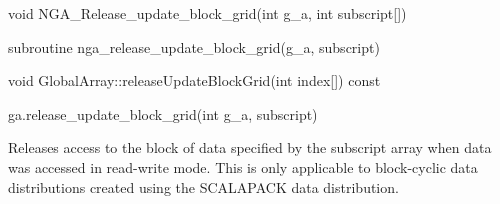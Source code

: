 \documentclass[12pt]{article}
\begin{document}


\begin{capi}
\begin{ccode}
void NGA_Release_update_block_grid(int g_a, int subscript[])
\end{ccode}
\begin{funcargs}
\end{funcargs}
\end{capi}

\begin{fapi}
\begin{fcode}
subroutine nga_release_update_block_grid(g_a, subscript)
\end{fcode}
\begin{funcargs}
\end{funcargs}
\end{fapi}

\begin{cxxapi}
\begin{cxxcode}
void GlobalArray::releaseUpdateBlockGrid(int index[]) const
\end{cxxcode}
\begin{funcargs}
\end{funcargs}
\end{cxxapi}

\begin{pyapi}
\begin{pycode}
ga.release_update_block_grid(int g_a, subscript)
\end{pycode}
\begin{funcargs}
\end{funcargs}
\end{pyapi}

\local

\begin{desc}

Releases access to the block of data specified by the subscript array when data
was accessed in read-write mode. This is only applicable to block-cyclic data
distributions created using the SCALAPACK data distribution.

\end{desc}
\end{document}
